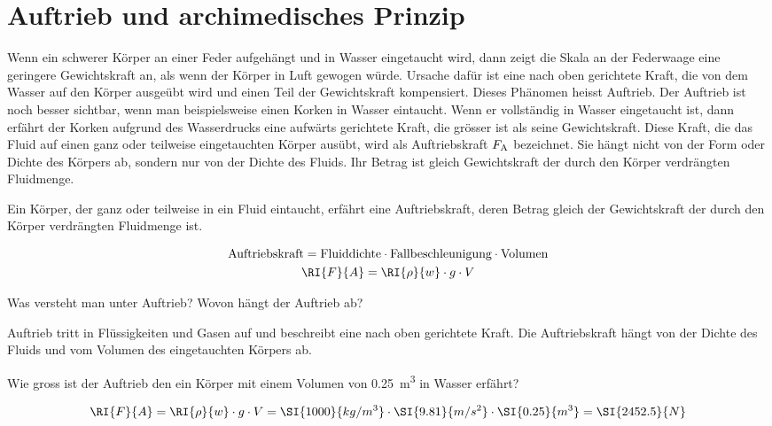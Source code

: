 
\section*{Auftrieb und archimedisches Prinzip}
Wenn ein schwerer Körper an einer Feder aufgehängt und in Wasser eingetaucht wird, dann
zeigt die Skala an der Federwaage eine geringere Gewichtskraft an, als wenn der Körper
in Luft gewogen würde. Ursache dafür ist eine nach oben gerichtete Kraft, die von dem Wasser
auf den Körper ausgeübt wird und einen Teil der Gewichtskraft kompensiert. Dieses Phänomen
heisst Auftrieb. Der Auftrieb ist noch besser sichtbar, wenn man beispielsweise einen
Korken in Wasser eintaucht. Wenn er vollständig in Wasser eingetaucht ist, dann erfährt 
der Korken aufgrund des Wasserdrucks eine aufwärts gerichtete Kraft, die grösser ist
als seine Gewichtskraft. Diese Kraft, die das Fluid auf einen ganz oder teilweise eingetauchten
Körper ausübt, wird als Auftriebskraft $F_{\textrm A}$ bezeichnet. Sie hängt nicht von der Form
oder Dichte des Körpers ab, sondern nur von der Dichte des Fluids. Ihr Betrag ist gleich Gewichtskraft der
durch den Körper verdrängten Fluidmenge.

\begin{cbox}
Ein Körper, der ganz oder teilweise in ein Fluid eintaucht, erfährt eine Auftriebskraft,
deren Betrag gleich der Gewichtskraft der durch den Körper verdrängten Fluidmenge ist.

\begin{gather*}
	\text{Auftriebskraft} = \text {Fluiddichte} \cdot \text{Fallbeschleunigung}\cdot\text{Volumen}\\
	\RI{F}{A} = \RI{\rho}{w} \cdot g \cdot V
\end{gather*}
\end{cbox}

\begin{aufgabe}
	Was versteht man unter Auftrieb? Wovon hängt der Auftrieb ab?
	\begin{loesung}
		Auftrieb tritt in Flüssigkeiten und Gasen auf und beschreibt eine nach oben gerichtete Kraft.
		Die Auftriebskraft hängt von der Dichte des Fluids und vom Volumen des eingetauchten Körpers ab.
	\end{loesung}
\end{aufgabe}

\begin{aufgabe}
	Wie gross ist der Auftrieb den ein Körper mit einem Volumen von \SI{0.25}{m^3} in Wasser erfährt?
	\begin{loesung}
		\begin{eqnarray*}
			\RI{F}{A} = \RI{\rho}{w} \cdot g \cdot V=\SI{1000}{kg/m^3}\cdot\SI{9.81}{m/s^2}\cdot\SI{0.25}{m^3}=\SI{2452.5}{N}
		\end{eqnarray*}
	\end{loesung}
\end{aufgabe}

